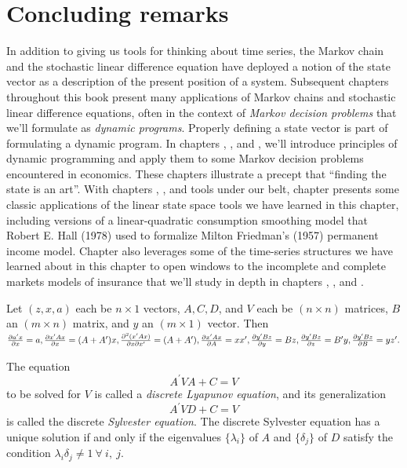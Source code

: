 \section{Concluding remarks}\label{concl1}%
In addition to giving us tools for thinking about time series, the
Markov chain and the stochastic linear difference equation have
deployed a  notion of the state vector as a
description of the present position of a system. 
 Subsequent chapters throughout this book present many applications of
Markov chains and stochastic linear difference equations, often
in the context of 
{\it Markov decision problems} that we'll formulate as {\it dynamic programs}.  Properly defining  a state vector is  part of formulating
a dynamic program.  In chapters , , and ,
we'll introduce principles of  dynamic programming and  apply them   to some  Markov decision problems encountered 
in economics. These chapters illustrate a precept that ``finding the state is an art''. With chapters , , and  tools under our belt,
 chapter
  presents some classic applications of the linear state
space tools we have learned in this chapter, including versions of a linear-quadratic consumption smoothing model that Robert E. Hall (1978)
used to formalize Milton Friedman's (1957) permanent income model. Chapter   also leverages some of the time-series structures we have learned about in this chapter to open windows to the incomplete and complete  markets models of insurance that we'll study in depth in 
chapters , ,  and .
%
%


\medskip

\label{appendixLQA}%
Let $(z,x,a)$ each be $n\times 1$ vectors, $A,C,D$, and $V$
each be $(n\times n)$ matrices, $B$ an $(m\times n)$ matrix, and $y$
an $(m\times 1)$ vector.  Then
$ {\partial a^\prime x\over \partial x} = a,
{\partial x^\prime A x\over \partial x} = (A + A^\prime) x,
{\partial^2 (x^\prime Ax)\over \partial x \partial x^\prime}=
(A+A^\prime),
{\partial x^\prime Ax\over \partial A} = x x^\prime,
{\partial y^\prime Bz\over \partial y} = Bz,
{\partial y^\prime Bz\over \partial z} = B^\prime y,
{\partial y^\prime Bz\over \partial B} = y z^\prime.$

The equation
$$A^\prime V A + C = V$$
to be solved for $V$ is called a {\it discrete Lyapunov equation}, and
its generalization
$$A^\prime V D + C = V$$
is called the discrete {\it Sylvester equation}.
The discrete Sylvester equation
%
 has a unique solution
if and only if the eigenvalues $\{\lambda_i\}$
of $A$ and $\{\delta_j\}$ of $D$ satisfy the condition
$\lambda_i \delta_j \not=  1 \ \forall \ i, \ j.$



